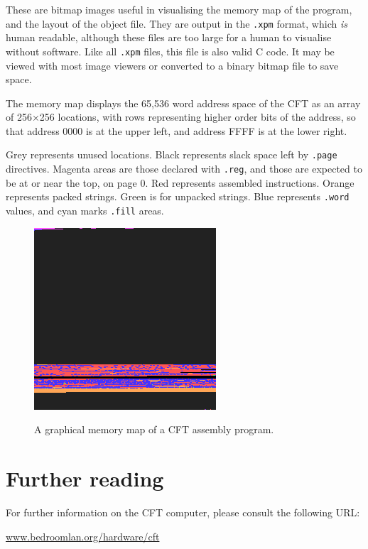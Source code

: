 \documentclass[11pt,a4paper,twocolumns]{article}
\newcommand\link[1]{\sf\href{http://#1}{#1}}
\newcommand\f[1]{{\color{black}\texttt{#1}}}
\newcommand\hex[1]{\textsf{#1}}
\begin{document}
These are bitmap images useful in visualising the memory map of the program,
and the layout of the object file. They are output in the {\tt .xpm} format,
which {\em is\/} human readable, although these files are too large for a human
to visualise without software. Like all {\tt .xpm} files, this file is also
valid C code. It may be viewed with most image viewers or converted to a binary
bitmap file to save space.

The memory map displays the 65,536 word address space of the CFT as an array of
256×256 locations, with rows representing higher order bits of the address, so
that address \hex{0000} is at the upper left, and address \hex{FFFF} is at the
lower right.

Grey represents unused locations. Black represents slack space left by
\f{.page} directives. Magenta areas are those declared with \f{.reg}, and those
are expected to be at or near the top, on page 0. Red represents assembled
instructions. Orange represents packed strings. Green is for unpacked
strings. Blue represents \f{.word} values, and cyan marks \f{.fill} areas.

\begin{figure}[t]
\centering
\includegraphics[width=\columnwidth]{forth.png}\\
\caption{\label{fig-graphical-map}A graphical memory map of a CFT assembly program.}
\end{figure}



\section{Further reading}

For further information on the CFT computer, please consult the
following URL:

\begin{center}
\link{www.bedroomlan.org/hardware/cft}
\end{center}
\end{document}
